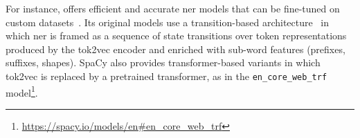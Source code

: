 For instance, \spacy offers efficient and accurate \ac{ner} models that can be fine-tuned on custom datasets~\cite{honnibal2020spacy}. Its original models use a transition-based architecture~\cite{AliEtAl2023UnintendedMemorization,lample-etal-2016-neural} in which \ac{ner} is framed as a sequence of state transitions over token representations produced by the tok2vec encoder and enriched with sub-word features (\eg prefixes, suffixes, shapes). SpaCy also provides transformer-based variants in which tok2vec is replaced by a pretrained transformer, as in the \texttt{en\_core\_web\_trf} model\footnote{\url{https://spacy.io/models/en\#en\_core\_web\_trf}}.

